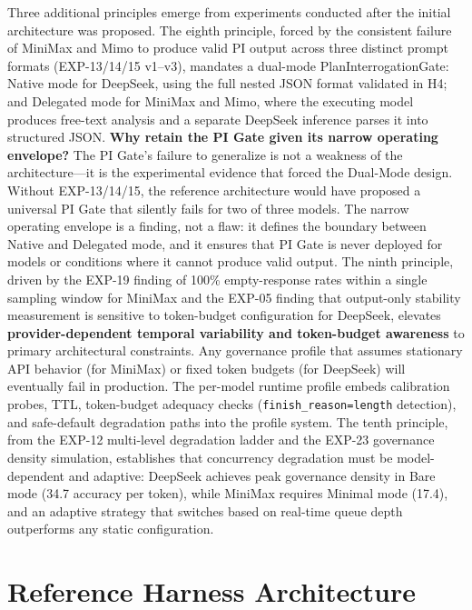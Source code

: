 \documentclass[11pt,a4paper]{article}
\begin{document}
Three additional principles emerge from experiments conducted after the initial architecture was proposed. The eighth principle, forced by the consistent failure of MiniMax and Mimo to produce valid PI output across three distinct prompt formats (EXP-13/14/15 v1--v3), mandates a dual-mode PlanInterrogationGate: Native mode for DeepSeek, using the full nested JSON format validated in H4; and Delegated mode for MiniMax and Mimo, where the executing model produces free-text analysis and a separate DeepSeek inference parses it into structured JSON. \textbf{Why retain the PI Gate given its narrow operating envelope?} The PI Gate's failure to generalize is not a weakness of the architecture---it is the experimental evidence that forced the Dual-Mode design. Without EXP-13/14/15, the reference architecture would have proposed a universal PI Gate that silently fails for two of three models. The narrow operating envelope is a finding, not a flaw: it defines the boundary between Native and Delegated mode, and it ensures that PI Gate is never deployed for models or conditions where it cannot produce valid output. The ninth principle, driven by the EXP-19 finding of 100\% empty-response rates within a single sampling window for MiniMax and the EXP-05 finding that output-only stability measurement is sensitive to token-budget configuration for DeepSeek, elevates \textbf{provider-dependent temporal variability and token-budget awareness} to primary architectural constraints. Any governance profile that assumes stationary API behavior (for MiniMax) or fixed token budgets (for DeepSeek) will eventually fail in production. The per-model runtime profile embeds calibration probes, TTL, token-budget adequacy checks (\texttt{finish\_reason=length} detection), and safe-default degradation paths into the profile system. The tenth principle, from the EXP-12 multi-level degradation ladder and the EXP-23 governance density simulation, establishes that concurrency degradation must be model-dependent and adaptive: DeepSeek achieves peak governance density in Bare mode (34.7 accuracy per token), while MiniMax requires Minimal mode (17.4), and an adaptive strategy that switches based on real-time queue depth outperforms any static configuration.

\section{Reference Harness Architecture}
\end{document}
